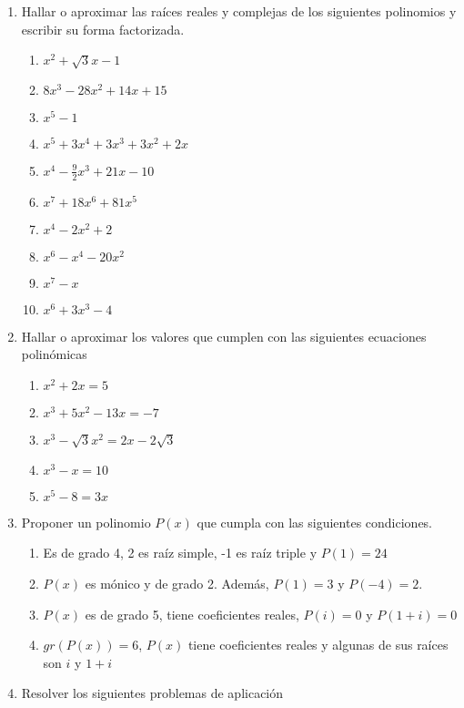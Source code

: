\documentclass[a4paper]{article}
\newcommand{\exercise}{\item}
\newcommand{\df}[2]{\displaystyle\frac{#1}{#2}}
\begin{document}
\begin{enumerate}
\begin{enumerate} [label=(\alph*)]
		\item $x^3+\alpha x^2+\beta x+5$ es divisible por $Q(x)=x^2+x+1$
	\end{enumerate}
	\exercise Hallar o aproximar las raíces reales y complejas de los siguientes polinomios y escribir su forma factorizada. 
	\begin{multicols}{2}
	\begin{enumerate} [label=(\alph*)]
		\item $x^2+\sqrt{3}x-1$
		\item $8x^3-28x^2+14x+15$
		\item $x^5-1$
		\item $x^5+3x^4+3x^3+3x^2+2x$
		\item $x^4-\df{9}{2}x^3+21x-10$
		\item $x^7+18x^6+81x^5$
		\item $x^4-2x^2+2$
		\item $x^6-x^4-20x^2$
		\item $x^7-x$
		\item $x^6+3x^3-4$
	\end{enumerate}
	\end{multicols}
	\exercise Hallar o aproximar los valores que cumplen con las siguientes ecuaciones polinómicas 
	\begin{multicols}{2}
	\begin{enumerate} [label=(\alph*)]
		\item $x^2+2x=5$
		\item $x^3+5x^2-13x = -7$
		\item $x^3 -\sqrt{3}x^2 = 2x - 2\sqrt{3}$
		\item $x^3-x=10$
		\item $x^5-8=3x$
	\end{enumerate}
	\end{multicols}
	\exercise Proponer un polinomio $P(x)$ que cumpla con las siguientes condiciones.
	\begin{enumerate} [label=(\alph*)]
		\item Es de grado 4, 2 es raíz simple, -1 es raíz triple y $P(1)=24$
		\item $P(x)$ es mónico y de grado 2. Además, $P(1)=3$ y $P(-4)=2$.
		\item $P(x)$ es de grado 5, tiene coeficientes reales, $P(i)=0$ y $P(1+i)=0$
		\item $gr\left(P(x)\right)=6$, $P(x)$ tiene coeficientes reales y algunas de sus raíces son $i$ y $1+i$
	\end{enumerate}
	\exercise Resolver los siguientes problemas de aplicación

\end{enumerate}
\end{document}
